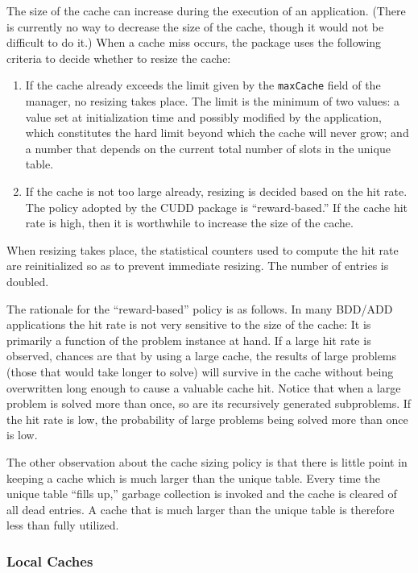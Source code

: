 \documentclass[11pt]{article}
\begin{document}
The size of the cache can increase during the execution of an
application. (There is currently no way to decrease the size of the
cache, though it would not be difficult to do it.) When a cache miss
occurs, the package uses the following criteria to decide whether to
resize the cache:
\begin{enumerate}
\item If the cache already exceeds the limit given by the
  \texttt{maxCache} field of the manager, no resizing
  takes place.  The limit is the minimum of two values: a value set at
  initialization time and possibly modified by the application, which
  constitutes the hard limit beyond which the cache will never grow;
  and a number that depends on the current total number of slots in
  the unique table.
\item If the cache is not too large already, resizing is decided based
  on the hit rate. The policy adopted by the CUDD package is
  ``reward-based.'' If the cache hit
  rate is high, then it is worthwhile to increase the size of the
  cache.
\end{enumerate}
When resizing takes place, the statistical counters  used to compute the hit rate are reinitialized so as to
prevent immediate resizing. The number of entries is doubled.

The rationale for the ``reward-based''
policy is as follows. In many BDD/ADD applications the hit rate is
not very sensitive to the size of the cache: It is primarily a
function of the problem instance at hand.  If a large hit rate is
observed, chances are that by using a large cache, the results of
large problems (those that would take longer to solve) will survive in
the cache without being overwritten long enough to cause a valuable
cache hit. Notice that when a large problem is solved more than once,
so are its recursively generated subproblems.  If the hit rate is
low, the probability of large problems being solved more than once is
low.

The other observation about the cache sizing policy is that there is
little point in keeping a cache which is much larger than the unique
table. Every time the unique table ``fills up,'' garbage collection is
invoked and the cache is cleared of all dead entries. A cache that is
much larger than the unique table is therefore
less than fully utilized.

\subsubsection{Local Caches}
\label{sec:local-caches}
\end{document}
